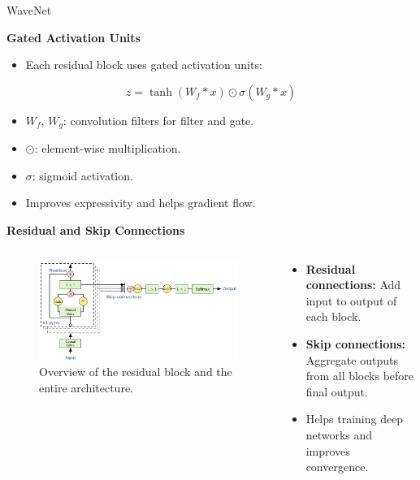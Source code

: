 \begin{frame}[allowframebreaks]{WaveNet}
    \framebreak

    \textbf{Gated Activation Units}

    \begin{itemize}
        \item Each residual block uses gated activation units:
    \end{itemize}
    \begin{equation*}
        z = \tanh(W_{f} * x) \odot \sigma(W_{g} * x)
    \end{equation*}
    \begin{itemize}
        \item $W_{f}$, $W_{g}$: convolution filters for filter and gate.
        \item $\odot$: element-wise multiplication.
        \item $\sigma$: sigmoid activation.
        \item Improves expressivity and helps gradient flow.
    \end{itemize}

    \framebreak

    \textbf{Residual and Skip Connections}

    \begin{columns}
        \begin{column}{0.6\linewidth}
            \begin{figure}
                \centering
                \includegraphics[width=1\linewidth]{images/autoregressive/architecture-residual-block.png}
                \caption*{Overview of the residual block and the entire architecture.}
            \end{figure}
        \end{column}
        \begin{column}{0.5\linewidth}
            \begin{itemize}
                \item \textbf{Residual connections:} Add input to output of each block.
                \item \textbf{Skip connections:} Aggregate outputs from all blocks before final output.
                \item Helps training deep networks and improves convergence.
            \end{itemize}
        \end{column}
    \end{columns}


\end{frame}
